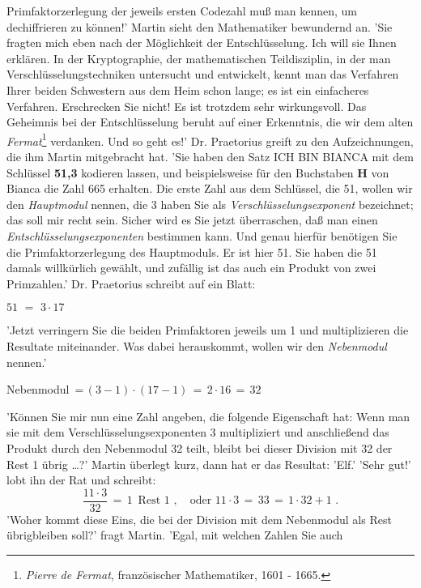 Primfaktorzerlegung der jeweils ersten Codezahl mu{\ss} man kennen, um
dechiffrieren zu k\"onnen!' Martin sieht den Mathematiker bewundernd an. 'Sie
fragten mich eben nach der M\"oglichkeit der Entschl\"usselung. Ich will sie
Ihnen erkl\"aren. In der Kryptographie, der mathematischen Teildisziplin, in
der man Verschl\"usselungstechniken untersucht und entwickelt, kennt man das
Verfahren Ihrer beiden Schwestern aus dem Heim schon lange; es ist ein
einfacheres Verfahren. Erschrecken Sie nicht! Es ist trotzdem sehr wirkungsvoll.
Das Geheimnis bei der Entschl\"usselung beruht auf einer Erkenntnis, die wir
dem alten {\em Fermat\/}\footnote{{\em Pierre de Fermat\/}, franz\"osischer
Mathematiker, 1601 - 1665.} verdanken. Und so geht es!' Dr. Praetorius
greift zu den Aufzeichnungen, die ihm Martin mitgebracht hat. 'Sie haben den
Satz ICH BIN BIANCA mit dem Schl\"ussel {\bf 51,3} kodieren lassen, und
beispielsweise f\"ur den Buchstaben {\bf H} von Bianca die Zahl 665 erhalten.
Die erste Zahl aus dem Schl\"ussel, die 51, wollen wir den {\em Hauptmodul\/}
nennen, die 3 haben Sie als {\em Verschl\"usselungsexponent\/} bezeichnet;
das soll mir recht sein. Sicher wird es Sie jetzt \"uberraschen, da{\ss} man
einen {\em Entschl\"usselungsexponenten\/} bestimmen kann. Und genau hierf\"ur
ben\"otigen Sie die Primfaktorzerlegung des Hauptmoduls. Er ist hier 51. Sie
haben die 51 damals willk\"urlich gew\"ahlt, und zuf\"allig ist das auch ein
Produkt von zwei Primzahlen.' Dr. Praetorius schreibt auf ein Blatt:
\begin{center}
\(51\,\,=\,\,3\cdot 17 \)
\end{center}
'Jetzt verringern Sie die beiden Primfaktoren jeweils um 1 und multiplizieren
die Resultate miteinander. Was dabei herauskommt, wollen wir den
{\em Nebenmodul\/} nennen.'
\begin{center}
Nebenmodul \,=\,\((3-1)\cdot (17-1)\,=\,2\cdot 16 \,=\,32 \)
\end{center}
'K\"onnen Sie mir nun eine Zahl angeben, die folgende Eigenschaft hat: Wenn man
sie mit dem Verschl\"usselungsexponenten 3 multipliziert und anschlie{\ss}end
das Produkt durch den Nebenmodul 32 teilt, bleibt bei dieser Division mit 32 der
Rest 1 \"ubrig \dots ?' Martin \"uberlegt kurz, dann hat er das Resultat: 'Elf.'
'Sehr gut!' lobt ihn der Rat und schreibt:
\[\frac{11\cdot 3}{32}\,=\,1 \,\,\,\mbox{Rest}\,\,1\,\,,\quad \mbox{oder}\,\,
11\cdot 3\,=\,33\,=\,1\cdot 32 + \mbox{1}\,\,.\]
'Woher kommt diese Eins, die bei der Division mit dem Nebenmodul als Rest
\"ubrigbleiben soll?' fragt Martin. 'Egal, mit welchen Zahlen Sie auch
